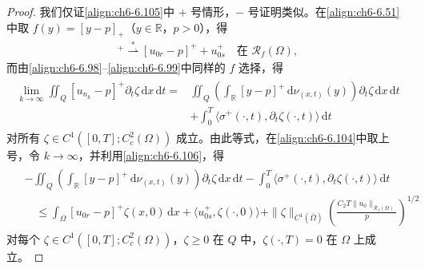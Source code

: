 \documentclass[../../main.tex]{subfiles}%
\begin{document}
\begin{proof}
我们仅证\eqref{align:ch6-6.105}中 $+$ 号情形，$-$ 号证明类似。在\eqref{align:ch6-6.51}中取 $f(y)=[y-p]_+$（$y\in\mathbb{R}$，$p>0$），得
\begin{align}
[u_{0n_k}-p]^+\stackrel{*}{\rightharpoonup}[u_{0r}-p]^++u^+_{0s}
\quad\text{在 }\mathscr{R}_f(\Omega), \label{align:ch6-6.106}
\end{align}
而由\eqref{align:ch6-6.98}--\eqref{align:ch6-6.99}中同样的 $f$ 选择，得
\begin{align*}
\begin{aligned}
\lim_{k\to\infty}\iint_Q[u_{n_k}-p]^+\partial_t\zeta\,\mathrm{d}x\,\mathrm{d}t
={}&\iint_Q\left(\int_\mathbb{R}[y-p]^+\,\mathrm{d}\nu_{(x,t)}(y)\right)\partial_t\zeta\,\mathrm{d}x\,\mathrm{d}t\\
&+\int_0^T\langle\sigma^+(\cdot,t),\partial_t\zeta(\cdot,t)\rangle\,\mathrm{d}t
\end{aligned}
\end{align*}
对所有 $\zeta\in C^1([0,T];C^2_c(\Omega))$ 成立。由此等式，在\eqref{align:ch6-6.104}中取上号，令 $k\to\infty$，并利用\eqref{align:ch6-6.106}，得
\begin{align}
\begin{aligned}
&-\iint_Q\left(\int_\mathbb{R}[y-p]^+\,\mathrm{d}\nu_{(x,t)}(y)\right)\partial_t\zeta\,\mathrm{d}x\,\mathrm{d}t
-\int_0^T\langle\sigma^+(\cdot,t),\partial_t\zeta(\cdot,t)\rangle\,\mathrm{d}t\\
&\quad\leqslant\int_\Omega[u_{0r}-p]^+\zeta(x,0)\,\mathrm{d}x
+\langle u^+_{0s},\zeta(\cdot,0)\rangle
+\|\zeta\|_{C^1(\overline\Omega)}\left(\frac{C_2T\|u_0\|_{\mathscr{R}_f(\Omega)}}{p}\right)^{1/2}
\end{aligned} \label{align:ch6-6.107}
\end{align}
对每个 $\zeta\in C^1([0,T];C^2_c(\Omega))$，$\zeta\geqslant0$ 在 $Q$ 中，$\zeta(\cdot,T)=0$ 在 $\Omega$ 上成立。


\end{proof}
\end{document}
